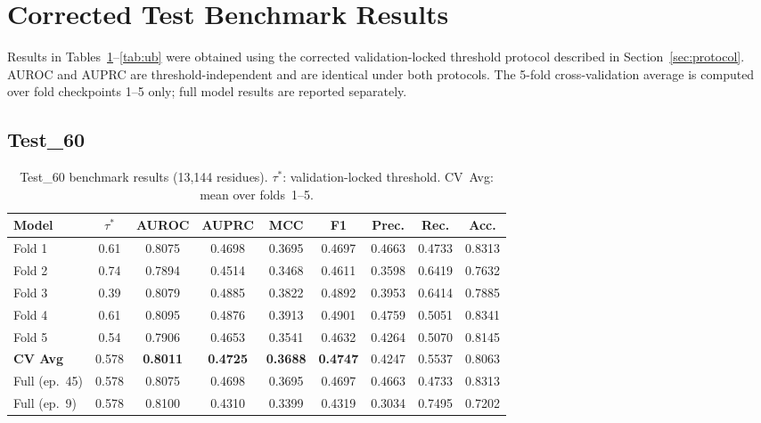 \documentclass[11pt,a4paper]{article}
\begin{document}
\section{Corrected Test Benchmark Results}

Results in Tables~\ref{tab:t60}--\ref{tab:ub} were obtained using the corrected
validation-locked threshold protocol described in Section~\ref{sec:protocol}.
AUROC and AUPRC are threshold-independent and are identical under both protocols.
The 5-fold cross-validation average is computed over fold checkpoints 1--5 only;
full model results are reported separately.

\subsection{Test\_60}

\begin{table}[h]
\centering
\caption{Test\_60 benchmark results (13{,}144 residues).
$\tau^*$: validation-locked threshold. CV~Avg: mean over folds~1--5.}
\label{tab:t60}
\setlength{\tabcolsep}{4.5pt}
\begin{tabular}{lcccccccc}
\toprule
\textbf{Model} & $\tau^*$ & \textbf{AUROC} & \textbf{AUPRC} & \textbf{MCC} & \textbf{F1} & \textbf{Prec.} & \textbf{Rec.} & \textbf{Acc.} \\
\midrule
Fold 1 & 0.61 & 0.8075 & 0.4698 & 0.3695 & 0.4697 & 0.4663 & 0.4733 & 0.8313 \\
Fold 2 & 0.74 & 0.7894 & 0.4514 & 0.3468 & 0.4611 & 0.3598 & 0.6419 & 0.7632 \\
Fold 3 & 0.39 & 0.8079 & 0.4885 & 0.3822 & 0.4892 & 0.3953 & 0.6414 & 0.7885 \\
Fold 4 & 0.61 & 0.8095 & 0.4876 & 0.3913 & 0.4901 & 0.4759 & 0.5051 & 0.8341 \\
Fold 5 & 0.54 & 0.7906 & 0.4653 & 0.3541 & 0.4632 & 0.4264 & 0.5070 & 0.8145 \\
\midrule
\textbf{CV Avg} & 0.578 & \textbf{0.8011} & \textbf{0.4725} & \textbf{0.3688} & \textbf{0.4747} & 0.4247 & 0.5537 & 0.8063 \\
\midrule
Full (ep.~45) & 0.578 & 0.8075 & 0.4698 & 0.3695 & 0.4697 & 0.4663 & 0.4733 & 0.8313 \\
Full (ep.~9)  & 0.578 & 0.8100 & 0.4310 & 0.3399 & 0.4319 & 0.3034 & 0.7495 & 0.7202 \\
\bottomrule
\end{tabular}
\end{table}
\end{document}
